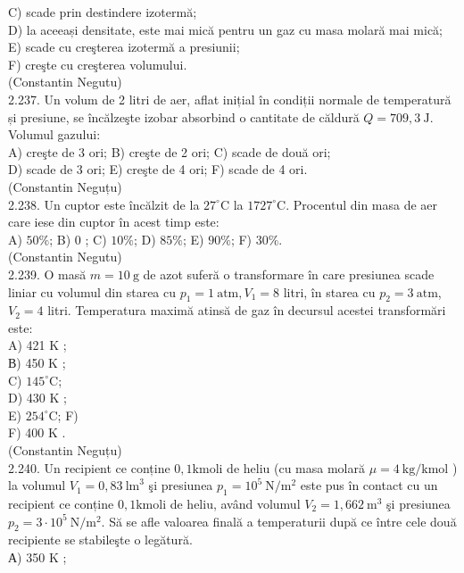 \documentclass[10pt]{article}
\begin{document}
C) scade prin destindere izotermă;\\
D) la aceeași densitate, este mai mică pentru un gaz cu masa molară mai mică;\\
E) scade cu creşterea izotermă a presiunii;\\
F) creşte cu creşterea volumului.\\
(Constantin Negutu)\\
2.237. Un volum de 2 litri de aer, aflat inițial în condiții normale de temperatură și presiune, se încălzeşte izobar absorbind o cantitate de căldură $Q=709,3 \mathrm{~J}$. Volumul gazului:\\
A) creşte de 3 ori; B) creşte de 2 ori; C) scade de două ori;\\
D) scade de 3 ori; E) creşte de 4 ori; F) scade de 4 ori.\\
(Constantin Neguțu)\\
2.238. Un cuptor este încălzit de la $27^{\circ} \mathrm{C}$ la $1727^{\circ} \mathrm{C}$. Procentul din masa de aer care iese din cuptor în acest timp este:\\
A) $50 \%$; B) 0 ; C) $10 \%$; D) $85 \%$; E) $90 \%$; F) $30 \%$.\\
(Constantin Negutu)\\
2.239. O masă $m=10 \mathrm{~g}$ de azot suferă o transformare în care presiunea scade liniar cu volumul din starea cu $p_{1}=1 \mathrm{~atm}, V_{1}=8$ litri, în starea cu $p_{2}=3 \mathrm{~atm}$, $V_{2}=4$ litri. Temperatura maximă atinsă de gaz în decursul acestei transformări este:\\
A) 421 K ;\\
В) 450 K ;\\
C) $145^{\circ} \mathrm{C}$;\\
D) 430 K ;\\
E) $254^{\circ} \mathrm{C}$; F)\\
F) 400 K .\\
(Constantin Neguțu)\\
2.240. Un recipient ce conține $0,1 \mathrm{kmoli}$ de heliu (cu masa molară $\mu=4 \mathrm{~kg} / \mathrm{kmol}$ ) la volumul $V_{1}=0,83 \mathrm{~lm}^{3}$ şi presiunea $p_{1}=10^{5} \mathrm{~N} / \mathrm{m}^{2}$ este pus în contact cu un recipient ce conține $0,1 \mathrm{kmoli}$ de heliu, având volumul $V_{2}=1,662 \mathrm{~m}^{3}$ şi presiunea $p_{2}=3 \cdot 10^{5} \mathrm{~N} / \mathrm{m}^{2}$. Să se afle valoarea finală a temperaturii după ce între cele două recipiente se stabileşte o legătură.\\
А) 350 K ;\\
\end{document}
